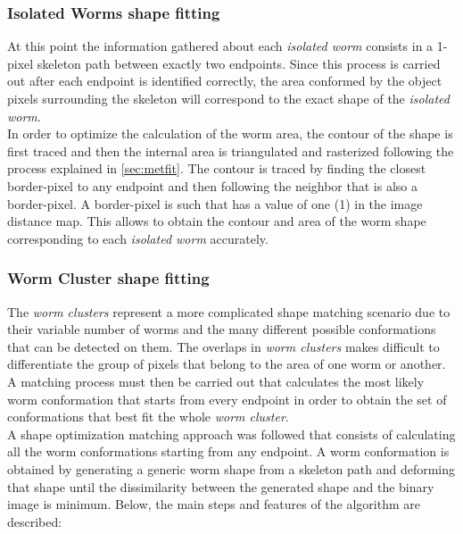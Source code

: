 \subsubsection{Isolated Worms shape fitting}
\label{sec:metiso}

At this point the information gathered about each \emph{isolated worm} consists in 
a 1-pixel skeleton path between exactly two endpoints. Since this process is carried
out after each endpoint is identified correctly, the area conformed by the object pixels
surrounding the skeleton will correspond to the exact shape of the \emph{isolated worm}.\\

In order to optimize the calculation of the worm area, the contour of the shape is first
traced and then the internal area is triangulated and rasterized following the process
explained in \ref{sec:metfit}. The contour is traced by finding the closest border-pixel
to any endpoint and then following the neighbor that is also a border-pixel. A
border-pixel is such that has a value of one (1) in the image distance map.
This allows to obtain the contour and area of the worm shape corresponding to each 
\emph{isolated worm} accurately.


\subsubsection{Worm Cluster shape fitting}
\label{sec:clusterfit}

The \emph{worm clusters} represent a more complicated shape matching scenario due to their
variable number of worms and the many different possible conformations that can be detected
on them. 
The  overlaps in \emph{worm clusters} makes difficult to differentiate the group of pixels
that belong to the area of one worm or another. A matching process must then be 
carried out that calculates the most likely worm conformation that starts from every
endpoint in order to obtain the set of conformations that best fit the whole 
\emph{worm cluster}.\\

A shape optimization matching approach was followed that consists of calculating all the 
worm conformations starting from any endpoint. A worm conformation is obtained by generating
a generic worm shape from a skeleton path and deforming that shape until the dissimilarity
between the generated shape and the binary image is minimum. Below, the main steps and 
features of the algorithm are described:


